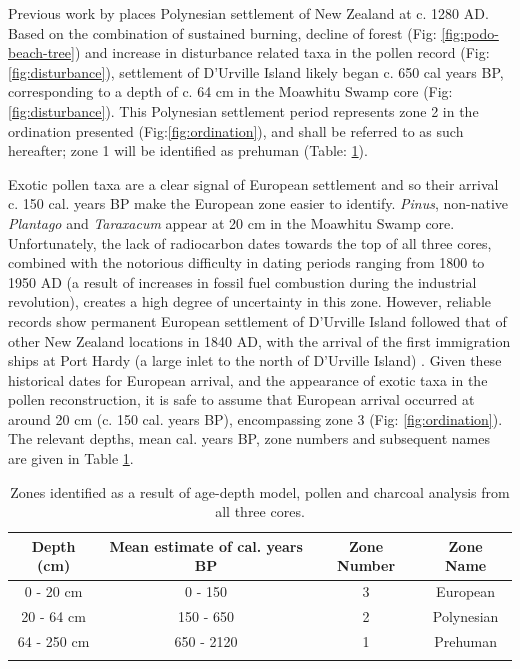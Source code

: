 \documentclass{article}
\begin{document}
Previous work by \cite{Wilmshurst2008} places Polynesian settlement of New Zealand at c. 1280 AD. Based on the combination of sustained burning, decline of forest (Fig: \ref{fig:podo-beach-tree}) and increase in disturbance related taxa in the pollen record (Fig: \ref{fig:disturbance}), settlement of D'Urville Island likely began c. 650 cal years BP, corresponding to a depth of c. 64 cm in the Moawhitu Swamp core (Fig: \ref{fig:disturbance}).  This Polynesian settlement period represents zone 2 in the ordination presented (Fig:\ref{fig:ordination}), and shall be referred to as such hereafter; zone 1 will be identified as prehuman (Table:  \ref{t:zone-name}).

Exotic pollen taxa are a clear signal of European settlement and so their arrival c. 150 cal. years BP make the European zone easier to identify. \textit{Pinus}, non-native \textit{Plantago} and \textit{Taraxacum} appear at 20 cm in the Moawhitu Swamp core.  Unfortunately, the lack of radiocarbon dates towards the top of all three cores, combined with the notorious difficulty in dating periods ranging from 1800 to 1950 AD \citep{hajdas2008radiocarbon} (a result of increases in fossil fuel combustion during the industrial revolution), creates a high degree of uncertainty in this zone. However, reliable records show permanent European settlement of D'Urville Island followed that of other New Zealand locations in 1840 AD, with the arrival of the first immigration ships at Port Hardy (a large inlet to the north of  D'Urville Island) \citep{walls}.  Given these historical dates for European arrival, and the appearance of exotic taxa in the pollen reconstruction, it is safe to assume that European arrival occurred at around 20 cm (c. 150 cal. years BP), encompassing zone 3 (Fig: \ref{fig:ordination}). The relevant depths, mean cal. years BP, zone numbers and subsequent names are given in Table \ref{t:zone-name}.    

\begin{table}[H]
	\caption{Zones identified as a result of age-depth model, pollen and charcoal analysis from all three cores.}
	\centering
	\label{t:zone-name}
	\begin{tabular}{c c c c }
		\noalign{\smallskip} \hline \hline \noalign{\smallskip}
		Depth (cm) & Mean estimate of cal. years BP & Zone Number & Zone Name  \\ \hline
		                             0 - 20 cm                               & 0 - 150                        & 3           & European   \\
		                             20 - 64 cm                              & 150 - 650                      & 2           & Polynesian \\
		                            64 - 250 cm                              & 650 - 2120                     & 1           & Prehuman   \\
		          \noalign{\smallskip} \hline \noalign{\smallskip}           &
	\end{tabular}
\end{table}
\end{document}
